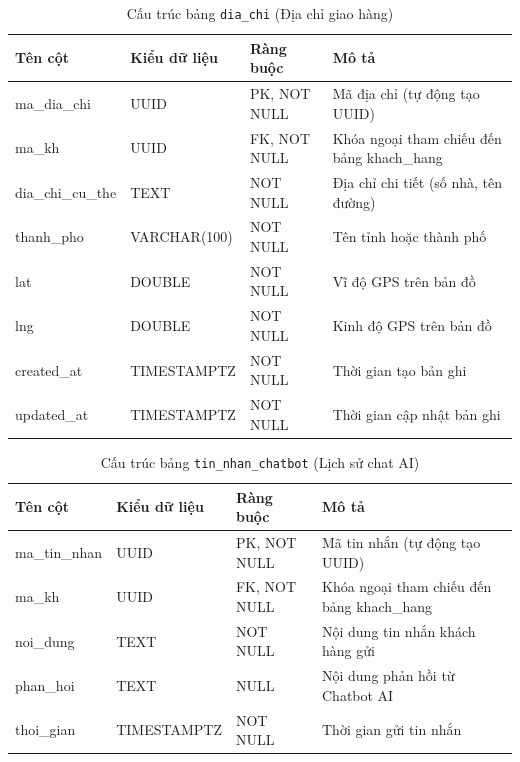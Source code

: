 \begin{table}[H]
  \centering
  \begin{tabularx}{\textwidth}{|l|l|l|>{\raggedright\arraybackslash}X|}
    \hline
    \textbf{Tên cột} & \textbf{Kiểu dữ liệu} & \textbf{Ràng buộc} & \textbf{Mô tả} \\
    \hline
    ma\_dia\_chi         & UUID            & PK, NOT NULL    & Mã địa chỉ (tự động tạo UUID) \\ \hline
    ma\_kh               & UUID            & FK, NOT NULL    & Khóa ngoại tham chiếu đến bảng khach\_hang \\ \hline
    dia\_chi\_cu\_the    & TEXT            & NOT NULL        & Địa chỉ chi tiết (số nhà, tên đường) \\ \hline
    thanh\_pho           & VARCHAR(100)    & NOT NULL        & Tên tỉnh hoặc thành phố \\ \hline
    lat                  & DOUBLE          & NOT NULL        & Vĩ độ GPS trên bản đồ \\ \hline
    lng                  & DOUBLE          & NOT NULL        & Kinh độ GPS trên bản đồ \\ \hline
    created\_at          & TIMESTAMPTZ     & NOT NULL        & Thời gian tạo bản ghi \\ \hline
    updated\_at          & TIMESTAMPTZ     & NOT NULL        & Thời gian cập nhật bản ghi \\
    \hline
  \end{tabularx}
  \caption{Cấu trúc bảng \texttt{dia\_chi} (Địa chỉ giao hàng)}
  \label{tab:db-dia-chi}
\end{table}

\begin{table}[H]
  \centering
  \begin{tabularx}{\textwidth}{|l|l|l|>{\raggedright\arraybackslash}X|}
    \hline
    \textbf{Tên cột} & \textbf{Kiểu dữ liệu} & \textbf{Ràng buộc} & \textbf{Mô tả} \\
    \hline
    ma\_tin\_nhan        & UUID            & PK, NOT NULL    & Mã tin nhắn (tự động tạo UUID) \\ \hline
    ma\_kh               & UUID            & FK, NOT NULL    & Khóa ngoại tham chiếu đến bảng khach\_hang \\ \hline
    noi\_dung            & TEXT            & NOT NULL        & Nội dung tin nhắn khách hàng gửi \\ \hline
    phan\_hoi            & TEXT            & NULL            & Nội dung phản hồi từ Chatbot AI \\ \hline
    thoi\_gian           & TIMESTAMPTZ     & NOT NULL        & Thời gian gửi tin nhắn \\
    \hline
  \end{tabularx}
  \caption{Cấu trúc bảng \texttt{tin\_nhan\_chatbot} (Lịch sử chat AI)}
  \label{tab:db-tin-nhan-chatbot}
\end{table}

